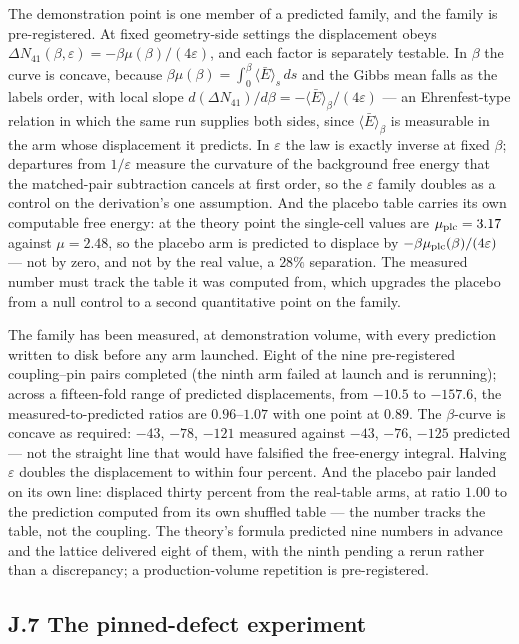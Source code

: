 \documentclass[11pt]{article}
\begin{document}
The demonstration point is one member of a predicted family, and the family is pre-registered. At fixed geometry-side settings the displacement obeys $\Delta N_{41}(\beta,\varepsilon)=-\beta\mu(\beta)/(4\varepsilon)$, and each factor is separately testable. In $\beta$ the curve is concave, because $\beta\mu(\beta)=\int_0^\beta\langle\bar E\rangle_s\,ds$ and the Gibbs mean falls as the labels order, with local slope $d(\Delta N_{41})/d\beta=-\langle\bar E\rangle_\beta/(4\varepsilon)$ --- an Ehrenfest-type relation in which the same run supplies both sides, since $\langle\bar E\rangle_\beta$ is measurable in the arm whose displacement it predicts. In $\varepsilon$ the law is exactly inverse at fixed $\beta$; departures from $1/\varepsilon$ measure the curvature of the background free energy that the matched-pair subtraction cancels at first order, so the $\varepsilon$ family doubles as a control on the derivation's one assumption. And the placebo table carries its own computable free energy: at the theory point the single-cell values are $\mu_{\rm plc}=3.17$ against $\mu=2.48$, so the placebo arm is predicted to displace by $-\beta\mu_{\rm plc}(\beta)/(4\varepsilon)$ --- not by zero, and not by the real value, a $28\%$ separation. The measured number must track the table it was computed from, which upgrades the placebo from a null control to a second quantitative point on the family.

The family has been measured, at demonstration volume, with every prediction written to disk before any arm launched. Eight of the nine pre-registered coupling--pin pairs completed (the ninth arm failed at launch and is rerunning); across a fifteen-fold range of predicted displacements, from $-10.5$ to $-157.6$, the measured-to-predicted ratios are $0.96$--$1.07$ with one point at $0.89$. The $\beta$-curve is concave as required: $-43$, $-78$, $-121$ measured against $-43$, $-76$, $-125$ predicted --- not the straight line that would have falsified the free-energy integral. Halving $\varepsilon$ doubles the displacement to within four percent. And the placebo pair landed on its own line: displaced thirty percent from the real-table arms, at ratio $1.00$ to the prediction computed from its own shuffled table --- the number tracks the table, not the coupling. The theory's formula predicted nine numbers in advance and the lattice delivered eight of them, with the ninth pending a rerun rather than a discrepancy; a production-volume repetition is pre-registered.

\subsection*{J.7 The pinned-defect experiment}
\end{document}
